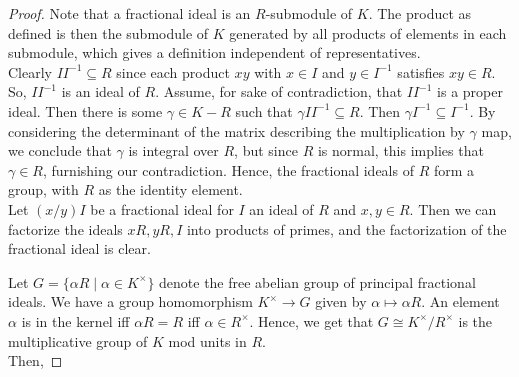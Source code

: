\begin{proof}
	Note that a fractional ideal is an $R$-submodule of $K$. The product as defined is then the submodule of $K$ generated by all products of elements in each submodule, which gives a definition independent of representatives. \\
	
	Clearly $II^{-1} \subseteq R$ since each product $xy$ with $x \in I$ and $y \in I^{-1}$ satisfies $xy \in R$. So, $II^{-1}$ is an ideal of $R$. Assume, for sake of contradiction, that $II^{-1}$ is a proper ideal. Then there is some $\gamma \in K-R$ such that $\gamma II^{-1} \subseteq R$. Then $\gamma I^{-1} \subseteq I^{-1}$. By considering the determinant of the matrix describing the multiplication by $\gamma$ map, we conclude that $\gamma$ is integral over $R$, but since $R$ is normal, this implies that $\gamma \in R$, furnishing our contradiction. Hence, the fractional ideals of $R$ form a group, with $R$ as the identity element. \\
	
	Let $(x/y) I$ be a fractional ideal for $I$ an ideal of $R$ and $x,y \in R$. Then we can factorize the ideals $xR,yR,I$ into products of primes, and the factorization of the fractional ideal is clear.
	
	Let $G = \{ \alpha R \mid \alpha \in K^\times \}$ denote the free abelian group of principal fractional ideals. We have a group homomorphism $K^\times \to G$ given by $\alpha \mapsto \alpha R$. An element $\alpha$ is in the kernel iff $\alpha R = R$ iff $\alpha \in R^\times$. Hence, we get that $G \cong K^\times/R^\times$ is the multiplicative group of $K$ mod units in $R$. \\
	
	Then,
\end{proof}
